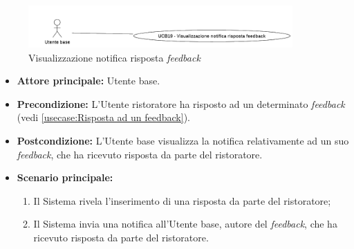 \label{usecase:Visualizzazione notifica risposta feedback}

\begin{figure}[h]
	\centering
	\includegraphics[width=0.9\textwidth]{./uml/UCB19.png} 
	\caption{Visualizzazione notifica risposta \textit{feedback}}
	\label{fig:UCB19}
  \end{figure}

\begin{itemize}
	\item \textbf{Attore principale:} Utente base.

	\item \textbf{Precondizione:} L'Utente ristoratore ha risposto ad un determinato \textit{feedback} (vedi \autoref{usecase:Risposta ad un feedback}).


	\item \textbf{Postcondizione:} L'Utente base visualizza la notifica relativamente ad un suo \textit{feedback}, che ha ricevuto risposta da parte del ristoratore.

	\item \textbf{Scenario principale:}
	      \begin{enumerate}
		      \item Il Sistema rivela l'inserimento di una risposta da parte del ristoratore;

		      \item Il Sistema invia una notifica all'Utente base, autore del \textit{feedback}, che ha ricevuto risposta da parte del ristoratore.
	      \end{enumerate}
\end{itemize}
